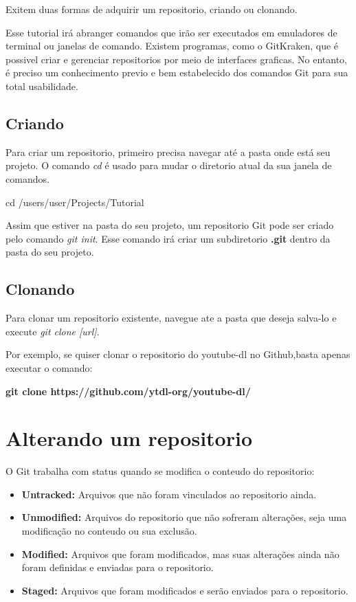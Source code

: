 \documentclass[]{article}
\begin{document}
Exitem duas formas de adquirir um repositorio, criando ou clonando.

Esse tutorial irá abranger comandos que irão ser executados em emuladores de terminal ou janelas de comando. 
Existem programas, como o GitKraken, que é possivel criar e gerenciar repositorios por meio de interfaces graficas. 
No entanto, é preciso um conhecimento previo e bem estabelecido dos comandos Git para sua total usabilidade.

\subsection*{Criando}

Para criar um repositorio, primeiro precisa navegar até a pasta onde está seu projeto. 
O comando \textit{cd} é usado para mudar o diretorio atual da sua janela de comandos.

cd /users/user/Projects/Tutorial

Assim que estiver na pasta do seu projeto, um repositorio Git pode ser criado pelo comando \textit{git init}.
 Esse comando irá criar um subdiretorio \textbf{ .git } dentro da pasta do seu projeto.

\subsection*{Clonando}

Para clonar um repositorio existente, navegue ate a pasta que deseja salva-lo e execute \textit{git clone [url]}.

Por exemplo, se quiser clonar o repositorio do youtube-dl no Github,basta apenas executar o comando: 

\textbf{git clone https://github.com/ytdl-org/youtube-dl/}

\section{Alterando um repositorio}

O Git trabalha com status quando se modifica o conteudo do repositorio:

\begin{itemize}
    \item {\textbf{Untracked: }} Arquivos que não foram vinculados ao repositorio ainda.
    \item {\textbf{Unmodified: }} Arquivos do repositorio que não sofreram alterações, seja uma modificação no conteudo ou sua exclusão.
    \item {\textbf{Modified: }} Arquivos que foram modificados, mas suas alterações ainda não foram definidas e enviadas para o repositorio.
    \item {\textbf{Staged: }} Arquivos que foram modificados e serão enviados para o repositorio.
\end{itemize}
\end{document}
